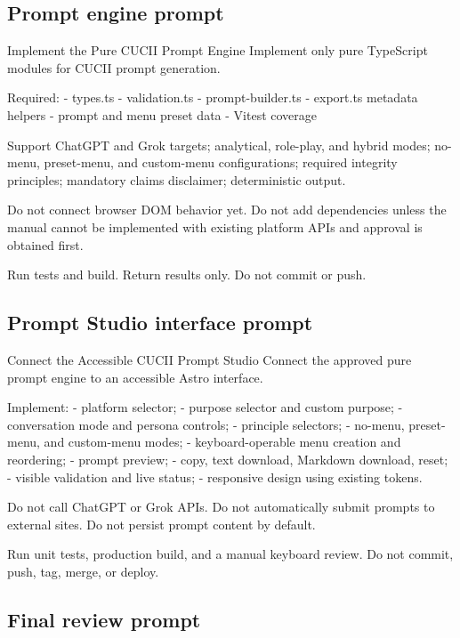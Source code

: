 \documentclass[11pt,letterpaper]{article}
\begin{document}
\subsection{Prompt engine prompt}

\begin{promptbox}{Implement the Pure CUCII Prompt Engine}
Implement only pure TypeScript modules for CUCII prompt generation.

Required:
- types.ts
- validation.ts
- prompt-builder.ts
- export.ts metadata helpers
- prompt and menu preset data
- Vitest coverage

Support ChatGPT and Grok targets; analytical, role-play, and hybrid
modes; no-menu, preset-menu, and custom-menu configurations; required
integrity principles; mandatory claims disclaimer; deterministic output.

Do not connect browser DOM behavior yet.
Do not add dependencies unless the manual cannot be implemented with
existing platform APIs and approval is obtained first.

Run tests and build. Return results only. Do not commit or push.
\end{promptbox}

\subsection{Prompt Studio interface prompt}

\begin{promptbox}{Connect the Accessible CUCII Prompt Studio}
Connect the approved pure prompt engine to an accessible Astro interface.

Implement:
- platform selector;
- purpose selector and custom purpose;
- conversation mode and persona controls;
- principle selectors;
- no-menu, preset-menu, and custom-menu modes;
- keyboard-operable menu creation and reordering;
- prompt preview;
- copy, text download, Markdown download, reset;
- visible validation and live status;
- responsive design using existing tokens.

Do not call ChatGPT or Grok APIs.
Do not automatically submit prompts to external sites.
Do not persist prompt content by default.

Run unit tests, production build, and a manual keyboard review.
Do not commit, push, tag, merge, or deploy.
\end{promptbox}

\subsection{Final review prompt}
\end{document}
